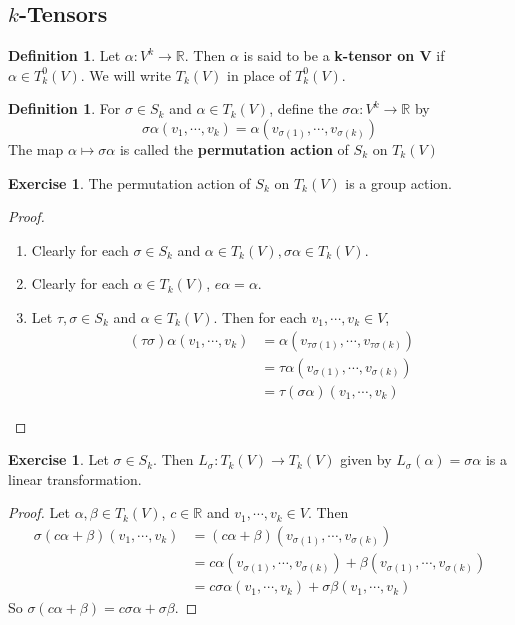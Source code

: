 \documentclass[12pt]{amsart}
\theoremstyle{definition}
\newtheorem{defn}[definition]{Definition}
\newtheorem{ex}[definition]{Exercise}
\newcommand{\al}{\alpha}
\newcommand{\sig}{\sigma}
\newcommand{\R}{\mathbb{R}}
\begin{document}
	
	\newpage
	\subsection{$k$-Tensors}	
	
	\begin{defn}
		Let $\al: V^k \rightarrow \R$. Then $\alpha$ is said to be a \textbf{k-tensor on V} if $\al \in T^0_k(V)$. We will write $T_k(V)$ in place of $T^0_k(V)$.
	\end{defn}

	\begin{defn}
		For $\sig \in S_k$ and $\al \in T_k(V)$, define the $\sig \al : V^k \rightarrow \R$ by $$\sig \al(v_1, \cdots, v_k) = \al(v_{\sig(1)}, \cdots, v_{\sig(k)})$$  The map $\al \mapsto \sig \al$ is called the \textbf{permutation action} of $S_k$ on $T_k(V)$
	\end{defn}

	\begin{ex}
		The permutation action of $S_k$ on $T_k(V)$ is a group action.
	\end{ex}

	\begin{proof} \
		\begin{enumerate}
			\item Clearly for each $\sig \in S_k$ and $\al \in T_k(V), \sig \al \in T_k(V) $.
			\item Clearly for each $\al \in T_k(V)$, $e \al = \al$.
			\item Let $\tau, \sig \in S_k$ and $\al \in T_k(V)$. Then for each $v_1, \cdots, v_k \in V$, 
			\begin{align*}
				(\tau \sig) \al(v_1, \cdots, v_k) 
				&= \al(v_{\tau \sig (1)}, \cdots, v_{\tau \sig (k)}) \\
				&= \tau \al(v_{ \sig (1)}, \cdots, v_{ \sig (k)}) \\ 
				&= \tau (\sig \al) (v_1, \cdots, v_k) 
			\end{align*}
		\end{enumerate}
	\end{proof}

	\begin{ex}
		Let $\sig \in S_k$. Then $L_{\sig}: T_k(V) \rightarrow T_k(V)$ given by $ L_{\sig}(\al) = \sig \al$ is a linear transformation.
	\end{ex}

	\begin{proof}
		Let $\al, \beta \in T_k(V)$, $c \in \R$ and $v_1, \cdots, v_k \in V$. Then 
		\begin{align*}
			\sig(c\al + \beta)(v_1, \cdots, v_k) 
			&= (c\al + \beta)(v_{\sig(1)}, \cdots, v_{\sig(k)}) \\
			&= c \al(v_{\sig(1)}, \cdots, v_{\sig(k)}) + \beta(v_{\sig(1)}, \cdots, v_{\sig(k)}) \\
			&= c \sig \al(v_1, \cdots, v_k) + \sig \beta(v_1, \cdots, v_k)
		\end{align*}
		So $\sig(c \al + \beta) = c\sig \al + \sig \beta$.
	\end{proof}
	
\end{document}
